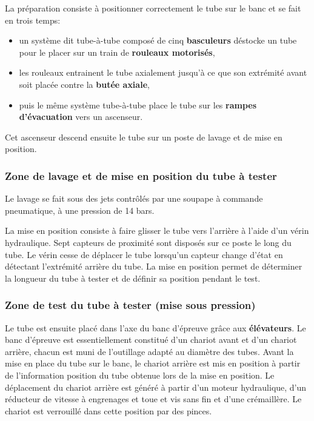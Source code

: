 La préparation consiste à positionner correctement le tube sur le banc et se fait en trois temps:
\begin{itemize}
 \item un système dit \og tube-à-tube \fg composé de cinq \textbf{basculeurs} déstocke un tube pour le placer sur un train de \textbf{rouleaux motorisés},
 \item les rouleaux entrainent le tube axialement jusqu'à ce que son extrémité avant soit placée contre la \textbf{butée axiale},
 \item puis le même système \og tube-à-tube \fg place le tube sur les \textbf{rampes d'évacuation} vers un ascenseur.
\end{itemize}

Cet ascenseur descend ensuite le tube sur un poste de lavage et de mise en position.

\subsubsection{Zone de lavage et de mise en position du tube à tester}

Le lavage se fait sous des jets contrôlés par une soupape à commande pneumatique, à une pression de 14 bars.

La mise en position consiste à faire glisser le tube vers l'arrière à l'aide d'un vérin hydraulique. Sept capteurs de proximité sont disposés sur ce poste le long du tube. Le vérin cesse de déplacer le tube lorsqu'un capteur change d'état en détectant l'extrémité arrière du tube. La mise en position permet de
déterminer la longueur du tube à tester et de définir sa position pendant le test.

\subsubsection{Zone de test du tube à tester (mise sous pression)}

Le tube est ensuite placé dans l'axe du banc d'épreuve grâce aux \textbf{élévateurs}. Le banc d'épreuve est essentiellement constitué d'un chariot avant et d'un chariot arrière, chacun est muni de l'outillage adapté au diamètre des tubes. Avant la mise en place du tube sur le banc, le chariot arrière est mis en position à partir de l'information \og position du tube \fg obtenue lors de la mise en position. Le déplacement du chariot arrière est généré à partir d'un moteur hydraulique, d'un réducteur de vitesse à engrenages et toue et vis sans fin et d'une crémaillère. Le chariot est verrouillé dans cette position par des pinces.

